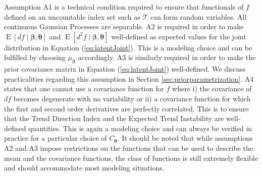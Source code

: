 \documentclass[
  11pt,
]{article}
\theoremstyle{nonumberplain}
\begin{document}
Assumption A1 is a technical condition required to ensure that
functionals of \(f\) defined on an uncountable index set such as
\(\mathcal{T}\) can form random variables. All continuous Gaussian
Processes are separable. A2 is required in order to make
\(\mathop{\mathrm{E}}[df \mid \bm{\beta}, \bm{\theta}]\) and
\(\mathop{\mathrm{E}}[d^2\!f \mid \bm{\beta}, \bm{\theta}]\)
well-defined as expected values for the joint distribution in Equation
(\ref{eq:latentJoint}). This is a modeling choice and can be fulfilled
by choosing \(\mu_{\bm{\beta}}\) accordingly. A3 is similarly required
in order to make the prior covariance matrix in Equation
(\ref{eq:latentJoint}) well-defined. We discuss practicalities regarding
this assumption in Section \ref{sec:priorparametrization}. A4 states
that one cannot use a covariance function for \(f\) where i) the
covariance of \(df\) becomes degenerate with no variability or ii) a
covariance function for which the first and second order derivatives are
perfectly correlated. This is to ensure that the Trend Direction Index
and the Expected Trend Instability are well-defined quantities. This is
again a modeling choice and can always be verified in practice for a
particular choice of \(C_{\bm{\theta}}\). It should be noted that while
assumptions A2 and A3 impose restrictions on the functions that can be
used to describe the mean and the covariance functions, the class of
functions is still extremely flexible and should accommodate most
modeling situations.
\end{document}
